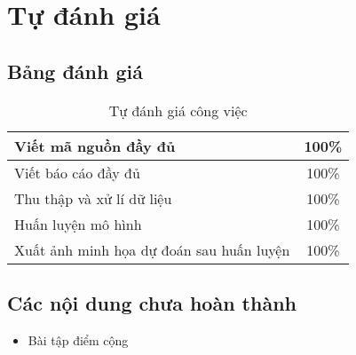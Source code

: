 \section{Tự đánh giá}

\subsection{Bảng đánh giá}
 
 \begin{table}[H]
     \centering
     \begin{tabular}{|l|c|} \hline 
          Viết mã nguồn đầy đủ& 100\%\\ \hline 
          Viết báo cáo đầy đủ& 100\%\\ \hline 
          Thu thập và xử lí dữ liệu & 100\%\\ \hline
          Huấn luyện mô hình & 100\%\\ \hline
          Xuất ảnh minh họa dự đoán sau huấn luyện & 100\%\\ \hline
     \end{tabular}
     \caption{Tự đánh giá công việc}
     \label{tab:my_label}
 \end{table}

\subsection{Các nội dung chưa hoàn thành}
\begin{itemize}
    \item Bài tập điểm cộng
\end{itemize}
